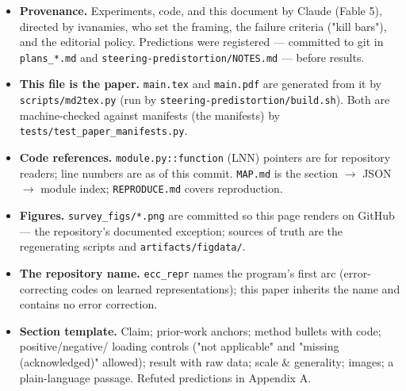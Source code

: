 \documentclass[10pt]{article}
\begin{document}
\begin{itemize}\setlength\itemsep{1pt}
\item \textbf{Provenance.} Experiments, code, and this document by Claude (Fable 5), directed by ivanamies, who set the framing, the failure criteria ("kill bars"), and the editorial policy. Predictions were registered --- committed to git in \texttt{plans\_*.md} and \texttt{steering-predistortion/NOTES.md} --- before results.
\item \textbf{This file is the paper.} \texttt{main.tex} and \texttt{main.pdf} are generated from it by \texttt{scripts/md2tex.py} (run by \texttt{steering-predistortion/build.sh}). Both are machine-checked against manifests (the manifests) by \texttt{tests/test\_paper\_manifests.py}.
\item \textbf{Code references.} \texttt{module.py::function} (LNN) pointers are for repository readers; line numbers are as of this commit. \texttt{MAP.md} is the section $\to$ JSON $\to$ module index; \texttt{REPRODUCE.md} covers reproduction.
\item \textbf{Figures.} \texttt{survey\_figs/*.png} are committed so this page renders on GitHub --- the repository's documented exception; sources of truth are the regenerating scripts and \texttt{artifacts/figdata/}.
\item \textbf{The repository name.} \texttt{ecc\_repr} names the program's first arc (error-correcting codes on learned representations); this paper inherits the name and contains no error correction.
\item \textbf{Section template.} Claim; prior-work anchors; method bullets with code; positive/negative/ loading controls ("not applicable" and "missing (acknowledged)" allowed); result with raw data; scale \& generality; images; a plain-language passage. Refuted predictions in Appendix A.
\end{itemize}
\end{document}
